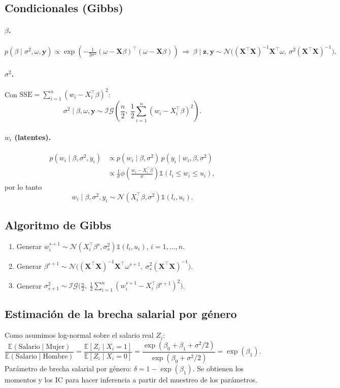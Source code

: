 \documentclass[11pt]{article}
\newcommand{\N}{\mathcal{N}}
\newcommand{\IG}{\mathcal{IG}}
\newcommand{\E}{\mathbb{E}}
\newcommand{\ind}{\mathbb{1}}
\newcommand{\bX}{\mathbf{X}}
\newcommand{\by}{\mathbf{y}}
\newcommand{\bz}{\mathbf{z}}
\theoremstyle{definition}
\begin{document}
\subsection{Condicionales (Gibbs)}
\paragraph{$\beta$.}
\[
p(\beta\mid\sigma^2,\omega,\by)\propto\exp\!\left(-\tfrac{1}{2\sigma^2}(\omega-\bX\beta)^{\top}(\omega-\bX\beta)\right)
\ \Rightarrow\ \beta\mid\bz,\by\sim\N\big((\bX^{\top}\bX)^{-1}\bX^{\top}\omega,\ \sigma^2(\bX^{\top}\bX)^{-1}\big).
\]

\paragraph{$\sigma^2$.} Con $\text{SSE}=\sum_{i=1}^n(w_i-X_i^{\top}\beta)^2$:
\[
\sigma^2\mid\beta,\omega,\by\sim\IG\!\left(\frac{n}{2},\ \frac{1}{2}\sum_{i=1}^n(w_i-X_i^{\top}\beta)^2\right).
\]

\paragraph{$w_i$ (latentes).}
\begin{align*}
p(w_i\mid\beta,\sigma^2,y_i)&\propto p(w_i\mid\beta,\sigma^2)\,p(y_i\mid w_i,\beta,\sigma^2)\\
&\propto\frac{1}{\sigma}\phi\!\left(\frac{w_i-X_i^{\top}\beta}{\sigma}\right)\ind(l_i\le w_i\le u_i),
\end{align*}
por lo tanto
\[
w_i\mid\beta,\sigma^2,y_i\sim\N(X_i^{\top}\beta,\sigma^2)\ind(l_i,u_i).
\]

\subsection{Algoritmo de Gibbs}
\begin{enumerate}[leftmargin=2em]
  \item Generar $w_i^{s+1}\sim\N(X_i^{\top}\beta^s,\sigma_s^2)\ind(l_i,u_i)$, $i=1,\dots,n$.
  \item Generar $\beta^{s+1}\sim\N\big((\bX^{\top}\bX)^{-1}\bX^{\top}\omega^{s+1},\ \sigma_s^2(\bX^{\top}\bX)^{-1}\big)$.
  \item Generar $\sigma^2_{s+1}\sim\IG\big(\tfrac{n}{2},\ \tfrac12\sum_{i=1}^n(w_i^{s+1}-X_i^{\top}\beta^{s+1})^2\big)$.
\end{enumerate}

\subsection{Estimación de la brecha salarial por género}
Como asumimos log-normal sobre el salario real $Z_i$:
\[
\frac{\E(\text{Salario}\mid\text{Mujer})}{\E(\text{Salario}\mid\text{Hombre})}=\frac{\E[Z_i\mid X_i=1]}{\E[Z_i\mid X_i=0]}=\frac{\exp(\beta_0+\beta_1+\sigma^2/2)}{\exp(\beta_0+\sigma^2/2)}=\exp(\beta_1).
\]
Parámetro de brecha salarial por género: $\delta=1-\exp(\beta_1)$. Se obtienen los momentos y los IC para hacer inferencia a partir del muestreo de los parámetros.
\end{document}
